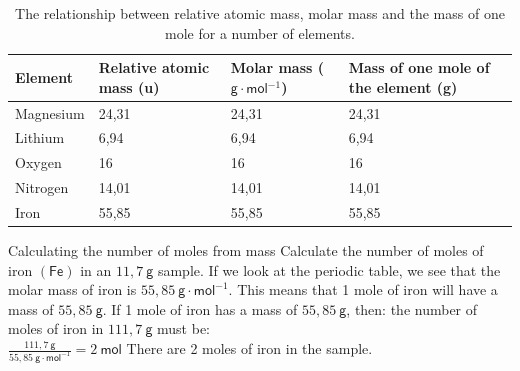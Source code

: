           \begin{table}[H]
        \begin{center}
      \label{m38717*uid11}
    \noindent
      \begin{tabular}{|l|l|l|l|}\hline
                \textbf{Element}
               &
                \textbf{Relative atomic mass (u)}
               &
                \textbf{Molar mass ($\mathsf{g}\ensuremath{\cdot}\mathsf{mol}{}^{-1}$)}
               &
                \textbf{Mass of one mole of the element (g)} \\ \hline
        Magnesium &
        24,31 &
        24,31 &
        24,31 \\ \hline
        Lithium &
        6,94 &
        6,94 &
        6,94 \\ \hline
        Oxygen &
        16 &
        16 &
        16 \\ \hline
        Nitrogen &
        14,01 &
        14,01 &
        14,01  \\ \hline
        Iron &
        55,85 &
        55,85 &
        55,85 \\ \hline
    \end{tabular}
      \end{center}
    \caption{The relationship between relative atomic mass, molar mass and the mass of one mole for a number of elements.}
\end{table}

      \begin{wex}{Calculating the number of moles from mass }{
      \label{m38717*id276776}Calculate the number of moles of iron $\mathsf{(Fe)}$ in an $11,7 ~\mathsf{g}$ sample.  }
{
      \label{m38717*id276821}If we look at the periodic table, we see that the molar mass of iron is $55,85 ~\mathsf{g} \cdot \mathsf{mol}^{-1}$. This means that 1 mole of iron will have a mass of $55,85 ~\mathsf{g}$.
      \label{m38717*id276848}If 1 mole of iron has a mass of $55,85 ~\mathsf{g}$, then: the number of moles of iron in $111,7 ~\mathsf{g}$ must be: \\
$\frac{111,7 ~\mathsf{g}}{55,85 ~\mathsf{g} \cdot{\mathsf{mol}}^{-1}}=2 ~\mathsf{mol}$
      \label{m38717*id276911}There are 2 moles of iron in the sample. 
}
    \end{wex}

